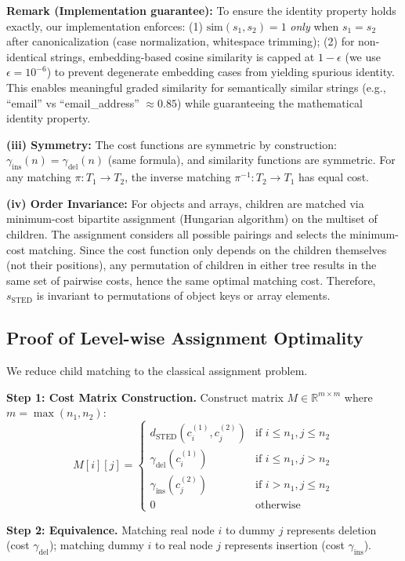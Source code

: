 \documentclass{article}
\theoremstyle{plain}
\theoremstyle{definition}
\begin{document}
\textbf{Remark (Implementation guarantee):} To ensure the identity property holds exactly, our implementation enforces: (1) $\text{sim}(s_1, s_2) = 1$ \emph{only} when $s_1 = s_2$ after canonicalization (case normalization, whitespace trimming); (2) for non-identical strings, embedding-based cosine similarity is capped at $1 - \epsilon$ (we use $\epsilon = 10^{-6}$) to prevent degenerate embedding cases from yielding spurious identity. This enables meaningful graded similarity for semantically similar strings (e.g., ``email'' vs ``email\_address'' $\approx 0.85$) while guaranteeing the mathematical identity property.

\textbf{(iii) Symmetry:} The cost functions are symmetric by construction: $\gamma_{\text{ins}}(n) = \gamma_{\text{del}}(n)$ (same formula), and similarity functions are symmetric. For any matching $\pi: T_1 \to T_2$, the inverse matching $\pi^{-1}: T_2 \to T_1$ has equal cost.

\textbf{(iv) Order Invariance:} For objects and arrays, children are matched via minimum-cost bipartite assignment (Hungarian algorithm) on the multiset of children. The assignment considers all possible pairings and selects the minimum-cost matching. Since the cost function only depends on the children themselves (not their positions), any permutation of children in either tree results in the same set of pairwise costs, hence the same optimal matching cost. Therefore, $s_{\text{STED}}$ is invariant to permutations of object keys or array elements.

\subsection{Proof of Level-wise Assignment Optimality}
\label{thm:hungarian}

We reduce child matching to the classical assignment problem.

\textbf{Step 1: Cost Matrix Construction.}
Construct matrix $M \in \mathbb{R}^{m \times m}$ where $m = \max(n_1, n_2)$:
\[
M[i][j] = \begin{cases}
d_{\text{STED}}(c_i^{(1)}, c_j^{(2)}) & \text{if } i \leq n_1, j \leq n_2 \\
\gamma_{\text{del}}(c_i^{(1)}) & \text{if } i \leq n_1, j > n_2 \\
\gamma_{\text{ins}}(c_j^{(2)}) & \text{if } i > n_1, j \leq n_2 \\
0 & \text{otherwise}
\end{cases}
\]

\textbf{Step 2: Equivalence.} Matching real node $i$ to dummy $j$ represents deletion (cost $\gamma_{\text{del}}$); matching dummy $i$ to real node $j$ represents insertion (cost $\gamma_{\text{ins}}$).
\end{document}
